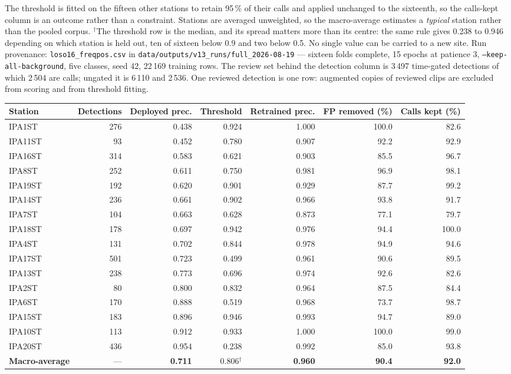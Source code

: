 \documentclass[review,3p,times]{elsarticle}
\begin{document}
\begin{table}[H]
{The threshold is fitted on the fifteen other stations to retain 95\,\% of their
calls and applied unchanged to the sixteenth, so the calls-kept column is an
outcome rather than a constraint. Stations are averaged unweighted, so the
macro-average estimates a \emph{typical} station rather than the pooled corpus.
$^\dagger$The threshold row is the median, and its spread matters more than its
centre: the same rule gives 0.238 to 0.946 depending on which station is held
out, ten of sixteen below 0.9 and two below 0.5. No single value can be
carried to a new site.
Run provenance: \texttt{loso16\_freqpos.csv} in
\texttt{data/outputs/v13\_runs/full\_2026-08-19} --- sixteen folds complete,
15 epochs at patience 3, \texttt{--keep-all-background}, five classes, seed 42,
22\,169 training rows. The review set behind the detection column is 3\,497
time-gated detections of which 2\,504 are calls; ungated it is 6\,110 and
2\,536. One reviewed detection is one row: augmented copies of reviewed clips
are excluded from scoring and from threshold fitting.}
\label{tab:loso}
\begin{tabular}{lrrrrrr}
\toprule
Station & Detections & Deployed prec. & Threshold & Retrained prec. & FP removed (\%) & Calls kept (\%) \\
\midrule
IPA1ST & 276 & 0.438 & 0.924 & 1.000 & 100.0 & 82.6 \\
IPA11ST & 93 & 0.452 & 0.780 & 0.907 & 92.2 & 92.9 \\
IPA16ST & 314 & 0.583 & 0.621 & 0.903 & 85.5 & 96.7 \\
IPA8ST & 252 & 0.611 & 0.750 & 0.981 & 96.9 & 98.1 \\
IPA19ST & 192 & 0.620 & 0.901 & 0.929 & 87.7 & 99.2 \\
IPA14ST & 236 & 0.661 & 0.902 & 0.966 & 93.8 & 91.7 \\
IPA7ST & 104 & 0.663 & 0.628 & 0.873 & 77.1 & 79.7 \\
IPA18ST & 178 & 0.697 & 0.942 & 0.976 & 94.4 & 100.0 \\
IPA4ST & 131 & 0.702 & 0.844 & 0.978 & 94.9 & 94.6 \\
IPA17ST & 501 & 0.723 & 0.499 & 0.961 & 90.6 & 89.5 \\
IPA13ST & 238 & 0.773 & 0.696 & 0.974 & 92.6 & 82.6 \\
IPA2ST & 80 & 0.800 & 0.832 & 0.964 & 87.5 & 84.4 \\
IPA6ST & 170 & 0.888 & 0.519 & 0.968 & 73.7 & 98.7 \\
IPA15ST & 183 & 0.896 & 0.946 & 0.993 & 94.7 & 89.0 \\
IPA10ST & 113 & 0.912 & 0.933 & 1.000 & 100.0 & 99.0 \\
IPA20ST & 436 & 0.954 & 0.238 & 0.992 & 85.0 & 93.8 \\
\midrule
\textbf{Macro-average} & --- & \textbf{0.711} & 0.806$^\dagger$ & \textbf{0.960} & \textbf{90.4} & \textbf{92.0} \\
\bottomrule
\end{tabular}
\end{table}
\end{document}
